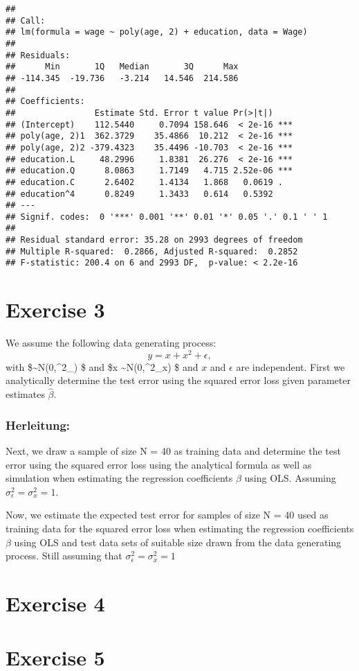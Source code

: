 \documentclass[
]{article}
\begin{document}
\begin{verbatim}
## 
## Call:
## lm(formula = wage ~ poly(age, 2) + education, data = Wage)
## 
## Residuals:
##      Min       1Q   Median       3Q      Max 
## -114.345  -19.736   -3.214   14.546  214.586 
## 
## Coefficients:
##                Estimate Std. Error t value Pr(>|t|)    
## (Intercept)    112.5440     0.7094 158.646  < 2e-16 ***
## poly(age, 2)1  362.3729    35.4866  10.212  < 2e-16 ***
## poly(age, 2)2 -379.4323    35.4496 -10.703  < 2e-16 ***
## education.L     48.2996     1.8381  26.276  < 2e-16 ***
## education.Q      8.0863     1.7149   4.715 2.52e-06 ***
## education.C      2.6402     1.4134   1.868   0.0619 .  
## education^4      0.8249     1.3433   0.614   0.5392    
## ---
## Signif. codes:  0 '***' 0.001 '**' 0.01 '*' 0.05 '.' 0.1 ' ' 1
## 
## Residual standard error: 35.28 on 2993 degrees of freedom
## Multiple R-squared:  0.2866, Adjusted R-squared:  0.2852 
## F-statistic: 200.4 on 6 and 2993 DF,  p-value: < 2.2e-16
\end{verbatim}

\hypertarget{exercise-3}{%
\section{Exercise 3}\label{exercise-3}}

We assume the following data generating process:
\[y = x + x^2 + \epsilon, \] with
\$\epsilon \sim N(0,\sigma\^{}2\_\epsilon) \$ and \$x
\sim N(0,\sigma\^{}2\_x) \$ and \(x\) and \(\epsilon\) are independent.
First we analytically determine the test error using the squared error
loss given parameter estimates \(\hat \beta\).

\hypertarget{herleitung}{%
\subsubsection{Herleitung:}\label{herleitung}}

Next, we draw a sample of size N = 40 as training data and determine the
test error using the squared error loss using the analytical formula as
well as simulation when estimating the regression coefficients \(\beta\)
using OLS. Assuming \(\sigma^2_\epsilon = \sigma^2_x = 1\).

Now, we estimate the expected test error for samples of size N = 40 used
as training data for the squared error loss when estimating the
regression coefficients \(\beta\) using OLS and test data sets of
suitable size drawn from the data generating process. Still assuming
that \(\sigma^2_\epsilon = \sigma^2_x = 1\)

\hypertarget{exercise-4}{%
\section{Exercise 4}\label{exercise-4}}

\hypertarget{exercise-5}{%
\section{Exercise 5}\label{exercise-5}}
\end{document}
